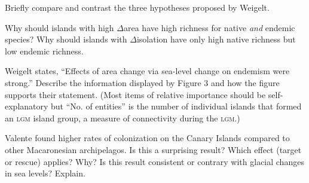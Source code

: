 \documentclass[11pt, addpoints]{exam}
\begin{document}
\begin{questions}
\question[5]
Briefly compare and contrast the three hypotheses proposed by Weigelt.

%
\else{}
\fi

\question[5]
Why should islands with high $\Delta$area have high richness for native \emph{and} 
endemic species? Why should islands with $\Delta$isolation have only high native 
richness but low endemic richness. 

%
\else{}
\fi


\question[5]
Weigelt states, “Effects of area change via sea-level change on endemism were strong.” 
Describe the information displayed by Figure 3 and how the figure supports their statement. (Most items of relative importance should be self-explanatory but “No. of entities” is the number of individual islands that formed an \textsc{lgm} island group, a measure of connectivity during the \textsc{lgm}.)

\else{}
\fi


\question[5]
Valente found higher rates of colonization on the Canary Islands compared to other Macaronesian archipelagos. Is this a surprising result? Which effect (target or rescue) applies? Why? Is this result consistent or contrary with glacial changes in sea levels? Explain.


\end{questions}
\end{document}
